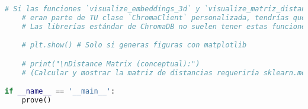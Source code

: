 \begin{lstlisting}[language=Python, caption={Script de Python para la prueba de concepto con ChromaDB.}, label={lst:chroma_prove_code}]
    # Si las funciones `visualize_embeddings_3d` y `visualize_matriz_distances`
    # eran parte de TU clase `ChromaClient` personalizada, tendrías que incluirlas.
    # Las librerías estándar de ChromaDB no suelen tener estas funciones de visualización directa.

    # plt.show() # Solo si generas figuras con matplotlib

    # print("\nDistance Matrix (conceptual):")
    # (Calcular y mostrar la matriz de distancias requeriría sklearn.metrics.pairwise_distances por ejemplo)

if __name__ == '__main__':
    prove()
\end{lstlisting}